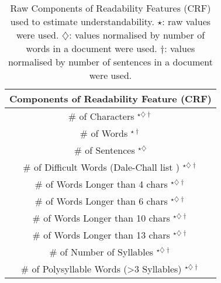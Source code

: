 \begin{table}
\caption{Raw Components of Readability Features (CRF) used to estimate understandability.
$\star$: raw values were used. $\diamondsuit$: values normalised
by number of words in a document were used. $\dagger$: values normalised
by number of sentences in a document were used.}
\label{tab:doc_features_rf} \vspace{-10pt}
\begin{tabular}{c}
\toprule 
\textbf{Components of Readability Feature (CRF)}\tabularnewline
\midrule 
\# of Characters $^{\star\diamondsuit\dagger}$ \tabularnewline
\# of Words $^{\star\dagger}$ \tabularnewline
\# of Sentences {$^{\star\diamondsuit}$} \tabularnewline
\# of Difficult Words (Dale-Chall list \cite{dale48}) $^{\star\diamondsuit\dagger}$ \tabularnewline
\# of Words Longer than 4 chars $^{\star\diamondsuit\dagger}$ \tabularnewline
\# of Words Longer than 6 chars $^{\star\diamondsuit\dagger}$ \tabularnewline
\# of Words Longer than 10 chars $^{\star\diamondsuit\dagger}$ \tabularnewline
\# of Words Longer than 13 chars $^{\star\diamondsuit\dagger}$ \tabularnewline
\# of Number of Syllables $^{\star\diamondsuit\dagger}$ \tabularnewline
\# of Polysyllable Words (\textgreater{}3 Syllables) $^{\star\diamondsuit\dagger}$ \tabularnewline
\bottomrule
\end{tabular}
\end{table}
